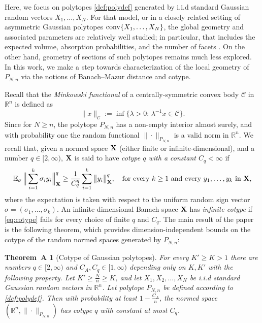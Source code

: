 \documentclass[11pt]{amsart}
\newtheorem*{theoremA*}{Theorem~A}
\theoremstyle{definition}
\theoremstyle{plain}
\newcommand{\R}{\mathbb{R}}
\def\R{{\mathbb R}}
\def\Exp{{\mathbb E}}
\def\conv{{\rm conv}}
\begin{document}
Here, we focus on polytopes
\eqref{def:polydef} generated by i.i.d standard Gaussian
random vectors $X_1,\dots,X_N$.
For that model, or in a closely related setting
of asymmetric Gaussian polytopes $\conv\{X_1,\dots,X_N\}$,
the global geometry and associated parameters
are relatively well studied; in particular, that includes
the expected volume,
absorption probabilities, and the number of
facets \cite{AS92,BV94,KZ19,KZ2020}.
On the other hand, geometry of sections of such polytopes remains
much less explored.
In this work, we make a step
towards characterization of 
the local geometry of $P_{N,n}$ via the notions of
Banach--Mazur distance and cotype.


\smallskip

Recall that the {\it Minkowski functional}
of a centrally-symmetric convex body $\mathcal C$ in $\R^n$
is defined as
$$
\|x\|_{\mathcal C}:=\inf\limits\{\lambda> 0:\,\lambda^{-1} x\in \mathcal C\}.
$$
Since for $N\geq n$, the polytope $P_{N,n}$
has a non-empty interior almost surely, and
with probability one the random functional $\|\cdot\|_{P_{N,n}}$
is a valid norm in $\R^n$.
We recall that, given a normed space ${\bf X}$
(either finite or infinite-dimensional), and
a number $q\in[2,\infty)$,
${\bf X}$
is said to have {\it cotype $q$ with a constant $C_q<\infty$} \cite{MP76}
if 
\begin{equation}\label{eq:cotype}
\Exp_\sigma\,\Big\|\sum_{i=1}^k \sigma_i y_i\Big\|_{{\bf X}}^q
\geq \frac{1}{C_q^q}\sum_{i=1}^k \big\|y_i\big\|_{{\bf X}}^q,
\quad
\mbox{for every $k\geq 1$ and every
$y_1,\dots,y_k$ in ${\bf X}$,}
\end{equation}
where the expectation is taken with respect to the
uniform random sign vector $\sigma=(\sigma_1,\dots,\sigma_k)$.
An infinite-dimensional Banach space ${\bf X}$
has {\it infinite cotype} if \eqref{eq:cotype}
fails for every choice of finite $q$ and $C_q$.
The main result of the paper is the following theorem,
which provides dimension-independent bounds on the cotype
of the random normed spaces generated by $P_{N,n}$:
\begin{theoremA*}[Cotype of Gaussian polytopes]
For every $K'\geq K>1$ there are numbers $q\in[2,\infty)$ and
$C_A,C_q\in[1,\infty)$ depending only on $K,K'$ with the following property.
Let $K'\geq \frac{N}{n}\geq K$, and let $X_1,X_2,\dots,X_N$
be i.i.d standard Gaussian random vectors in $\R^n$.
Let polytope $P_{N,n}$ be defined according to \eqref{def:polydef}.
Then with probability at least $1-\frac{C_A}{n}$,
the normed space $(\R^n,\|\cdot\|_{P_{N,n}})$
has cotype $q$ with constant at most $C_q$.
\end{theoremA*}
\end{document}
